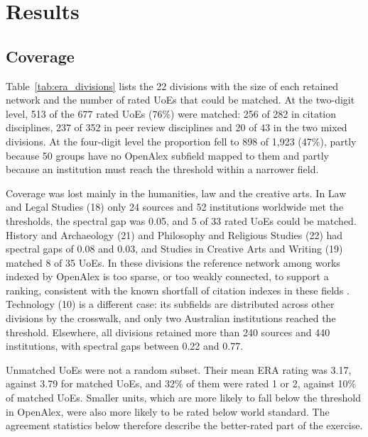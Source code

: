 \section{Results}
\label{sec:results}

\subsection{Coverage}

Table~\ref{tab:era_divisions} lists the 22 divisions with the size of each retained network and the number of rated UoEs that could be matched. At the two-digit level, 513 of the 677 rated UoEs (76\%) were matched: 256 of 282 in citation disciplines, 237 of 352 in peer review disciplines and 20 of 43 in the two mixed divisions. At the four-digit level the proportion fell to 898 of 1,923 (47\%), partly because 50 groups have no OpenAlex subfield mapped to them and partly because an institution must reach the threshold within a narrower field.

Coverage was lost mainly in the humanities, law and the creative arts. In Law and Legal Studies (18) only 24 sources and 52 institutions worldwide met the thresholds, the spectral gap was 0.05, and 5 of 33 rated UoEs could be matched. History and Archaeology (21) and Philosophy and Religious Studies (22) had spectral gaps of 0.08 and 0.03, and Studies in Creative Arts and Writing (19) matched 8 of 35 UoEs. In these divisions the reference network among works indexed by OpenAlex is too sparse, or too weakly connected, to support a ranking, consistent with the known shortfall of citation indexes in these fields \citep{mongeonJournalCoverageWeb2016}. Technology (10) is a different case: its subfields are distributed across other divisions by the crosswalk, and only two Australian institutions reached the threshold. Elsewhere, all divisions retained more than 240 sources and 440 institutions, with spectral gaps between 0.22 and 0.77.

Unmatched UoEs were not a random subset. Their mean ERA rating was 3.17, against 3.79 for matched UoEs, and 32\% of them were rated 1 or 2, against 10\% of matched UoEs. Smaller units, which are more likely to fall below the threshold in OpenAlex, were also more likely to be rated below world standard. The agreement statistics below therefore describe the better-rated part of the exercise.

